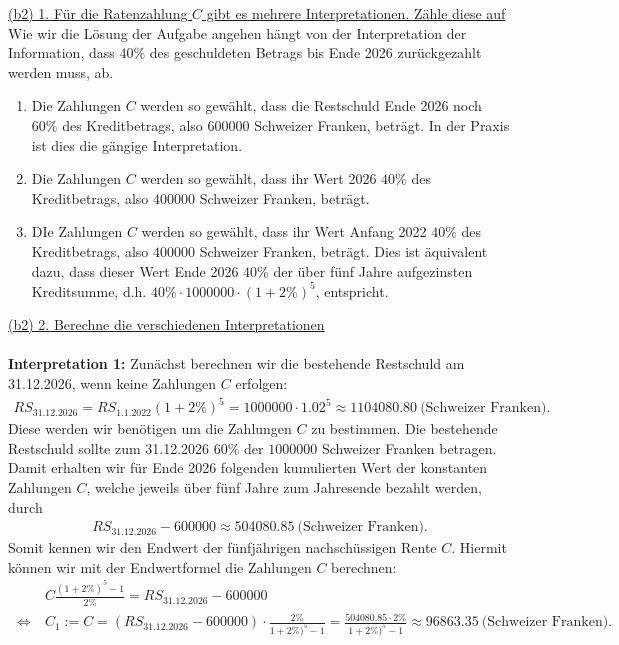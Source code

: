 \underline{(b2) 1. Für die Ratenzahlung $C$ gibt es mehrere Interpretationen. Zähle diese auf}\\
Wie wir die Lösung der Aufgabe angehen hängt von der Interpretation der Information, dass $40 \%$ des geschuldeten Betrags bis Ende 2026 zurückgezahlt werden muss, ab.
\begin{enumerate}
	\item 
	Die Zahlungen $C$ werden so gewählt, dass die Restschuld Ende 2026 noch $60 \%$ des Kreditbetrags, also $600000$ Schweizer Franken, beträgt.
	In der Praxis ist dies die gängige Interpretation.
	\item 
	Die Zahlungen $C$ werden so gewählt, dass ihr Wert 2026 $40 \%$ des Kreditbetrags, also $400000$ Schweizer Franken, beträgt.
	\item 
	DIe Zahlungen $C$ werden so gewählt, dass ihr Wert Anfang 2022 $40 \%$ des Kreditbetrags, also $400000$ Schweizer Franken, beträgt.
	Dies ist äquivalent dazu, dass dieser Wert Ende 2026 $40 \%$ der über fünf Jahre aufgezinsten Kreditsumme, d.h. $40 \% \cdot 1000000 \cdot ( 1 + 2 \%)^5$, entspricht. 
\end{enumerate}
\newpage
\underline{(b2) 2. Berechne die verschiedenen Interpretationen}\\
\\
\textbf{Interpretation 1:}
Zunächst berechnen wir die bestehende Restschuld am 31.12.2026, wenn keine Zahlungen $C$ erfolgen:
\begin{align*}
	RS_{\mathrm{31.12.2026}}
	=
	RS_{\mathrm{1.1.2022}} ( 1+ 2 \%)^5
	=
	1 000 000 \cdot 1.02^5 
	\approx
	1 104 080.80 \ \textrm{(Schweizer Franken)}.
\end{align*}
Diese werden wir benötigen um die Zahlungen $C$ zu bestimmen.
Die bestehende Restschuld sollte zum 31.12.2026 $60 \%$ der $1 000 000$ Schweizer Franken betragen.
Damit erhalten wir für Ende 2026 folgenden kumulierten Wert der konstanten Zahlungen $C$, welche jeweils über fünf Jahre zum Jahresende bezahlt werden, durch
\begin{align*}
	RS_{\mathrm{31.12.2026}}
	- 600 000 
	\approx 
	504 080.85
	\ \textrm{(Schweizer Franken)}.
\end{align*} 
Somit kennen wir den Endwert der fünfjährigen nachschüssigen Rente $C$. Hiermit können wir mit der Endwertformel die Zahlungen $C$ berechnen:
\begin{align*}
	&C \frac{(1+2\%)^5 -1 }{2 \%} = 	RS_{\mathrm{31.12.2026}}
	- 600 000\\
	\ \Leftrightarrow \
	&C_1:=C 
	= (RS_{\mathrm{31.12.2026}}
	- 600 000) \cdot \frac{2 \%}{1+2\%)^5 -1 }
	=
	\frac{504 080.85 \cdot 2 \%}{1+2\%)^5 -1 }
	\approx 96 863.35
	\ \textrm{(Schweizer Franken)}.
\end{align*}
